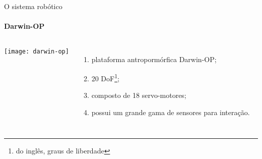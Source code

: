 \begin{frame}[t]{O sistema robótico}
    \transboxout[duration=0.5]
    \framesubtitle{Darwin-OP}
    \begin{columns}
            \texttt{[image: darwin-op]}
            \begin{enumerate}
                \item plataforma antropormórfica Darwin-OP;
                \item 20 DoF\footnote{do inglês, graus de liberdade};
                \item composto de 18 servo-motores;
                \item possui um grande gama de sensores para interação.
            \end{enumerate}
    \end{columns}
\end{frame}
